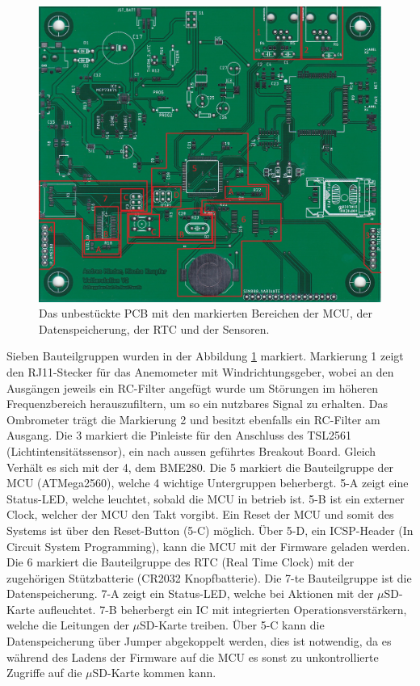 \begin{figure}[h]
\centering
\includegraphics[width=0.99\linewidth]{graphics/HW_Uebersicht/PCB_Sensoren_MCU_SD_RTC.jpg}
\caption{Das unbestückte PCB mit den markierten Bereichen der MCU, der Datenspeicherung, der RTC und der Sensoren.}
\label{fig:Uebersicht_PCB_MCU_RTC_SD_Sense}
\end{figure}
Sieben Bauteilgruppen wurden in der Abbildung \ref{fig:Uebersicht_PCB_MCU_RTC_SD_Sense} markiert. Markierung 1 zeigt den RJ11-Stecker für das Anemometer mit Windrichtungsgeber, wobei an den Ausgängen jeweils ein RC-Filter angefügt wurde um Störungen im höheren Frequenzbereich herauszufiltern, um so ein nutzbares Signal zu erhalten. Das Ombrometer trägt die Markierung 2 und besitzt ebenfalls ein RC-Filter am Ausgang. Die 3 markiert die Pinleiste für den Anschluss des TSL2561 (Lichtintensitätssensor), ein nach aussen geführtes Breakout Board. Gleich Verhält es sich mit der 4, dem BME280. Die 5 markiert die Bauteilgruppe der MCU (ATMega2560), welche 4 wichtige Untergruppen beherbergt. 5-A zeigt eine Status-LED, welche leuchtet, sobald die MCU in betrieb ist. 5-B ist ein externer Clock, welcher der MCU den Takt vorgibt. Ein Reset der MCU und somit des Systems ist über den Reset-Button (5-C) möglich. Über 5-D, ein ICSP-Header (In Circuit System Programming), kann die MCU mit der Firmware geladen werden. Die 6 markiert die Bauteilgruppe des RTC (Real Time Clock) mit der zugehörigen Stützbatterie (CR2032 Knopfbatterie). Die 7-te Bauteilgruppe ist die Datenspeicherung. 7-A zeigt ein Status-LED, welche bei Aktionen mit der $\mu$SD-Karte aufleuchtet. 7-B beherbergt ein IC mit integrierten Operationsverstärkern, welche die Leitungen der $\mu$SD-Karte treiben. Über 5-C kann die Datenspeicherung über Jumper abgekoppelt werden, dies ist notwendig, da es während des Ladens der Firmware auf die MCU es sonst zu unkontrollierte Zugriffe auf die $\mu$SD-Karte kommen kann.


